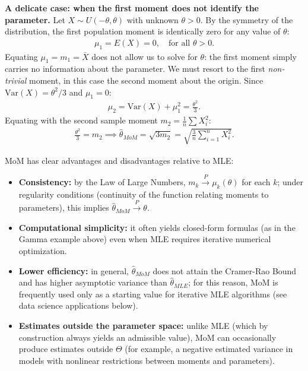 \begin{ejemplo}
	\textbf{A delicate case: when the first moment does not identify the parameter.}
	Let $X \sim U(-\theta, \theta)$ with unknown $\theta > 0$. By the symmetry of the distribution, the first population moment is identically zero for any value of $\theta$:
	\begin{align}
		\mu_1 = E(X) = 0, \quad \text{for all } \theta > 0.
	\end{align}
	Equating $\mu_1 = m_1 = \bar{X}$ does not allow us to solve for $\theta$: the first moment simply carries no information about the parameter. We must resort to the first \emph{non-trivial} moment, in this case the second moment about the origin. Since $\text{Var}(X) = \theta^2/3$ and $\mu_1 = 0$:
	\begin{align}
		\mu_2 = \text{Var}(X) + \mu_1^2 = \frac{\theta^2}{3}.
	\end{align}
	Equating with the second sample moment $m_2 = \frac{1}{n}\sum X_i^2$:
	\begin{align}
		\frac{\theta^2}{3} = m_2 \implies \hat{\theta}_{MoM} = \sqrt{3 m_2} = \sqrt{\frac{3}{n}\sum_{i=1}^n X_i^2}.
	\end{align}
\end{ejemplo}

\begin{observacion}
	MoM has clear advantages and disadvantages relative to MLE:
	\begin{itemize}
		\item \textbf{Consistency:} by the Law of Large Numbers, $m_k \xrightarrow{P} \mu_k(\theta)$ for each $k$; under regularity conditions (continuity of the function relating moments to parameters), this implies $\hat{\theta}_{MoM} \xrightarrow{P} \theta$.
		\item \textbf{Computational simplicity:} it often yields closed-form formulas (as in the Gamma example above) even when MLE requires iterative numerical optimization.
		\item \textbf{Lower efficiency:} in general, $\hat{\theta}_{MoM}$ does not attain the Cramer-Rao Bound and has higher asymptotic variance than $\hat{\theta}_{MLE}$; for this reason, MoM is frequently used only as a starting value for iterative MLE algorithms (see data science applications below).
		\item \textbf{Estimates outside the parameter space:} unlike MLE (which by construction always yields an admissible value), MoM can occasionally produce estimates outside $\Theta$ (for example, a negative estimated variance in models with nonlinear restrictions between moments and parameters).
	\end{itemize}
\end{observacion}

